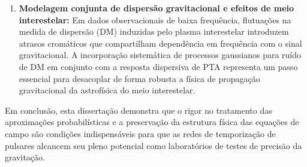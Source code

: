 \begin{enumerate}
  \item \textbf{Modelagem conjunta de dispersão gravitacional e efeitos de meio interestelar:} 
  Em dados observacionais de baixa frequência, flutuações na medida de dispersão (DM) induzidas pelo plasma interestelar introduzem atrasos cromáticos que compartilham dependência em frequência com o sinal gravitacional. A incorporação sistemática de processos gaussianos para ruído de DM em conjunto com a resposta dispersiva de PTA representa um passo essencial para desacoplar de forma robusta a física de propagação gravitacional da astrofísica do meio interestelar.
\end{enumerate}

Em conclusão, esta dissertação demonstra que o rigor no tratamento das aproximações probabilísticas e a preservação da estrutura física das equações de campo são condições indispensáveis para que as redes de temporização de pulsares alcancem seu pleno potencial como laboratórios de testes de precisão da gravitação.

